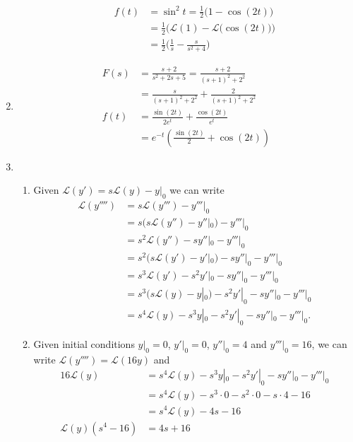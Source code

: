 \documentclass[10pt]{article}
\newcommand*{\La}{\mathcal{L}}
\begin{document}
\begin{enumerate}
\begin{enumerate}
\begin{align*}
            f(t) &= \sin^2t = \frac{1}{2}\big(1 - \cos(2t)\big) \\
            &= \frac{1}{2}\Big(\La(1) - \La\big(\cos(2t)\big)\Big) \\
            &= \frac{1}{2}\Big(\frac{1}{s} - \frac{s}{s^2 + 4}\Big)
          \end{align*}
      \end{enumerate}
    \item
      \begin{align*}
        F(s) &= \frac{s + 2}{s^2 + 2s + 5} = \frac{s + 2}{(s + 1)^2 + 2^2} \\
        &= \frac{s}{(s + 1)^2 + 2^2} + \frac{2}{(s + 1)^2 + 2^2} \\
        f(t) &= \frac{\sin(2t)}{2e^{t}} + \frac{\cos(2t)}{e^t} \\
             &= e^{-t}\left(\frac{\sin(2t)}{2} + \cos(2t)\right)
      \end{align*}
    \item
      \begin{enumerate}
        \item Given $\La(y') = s\La(y) - y|_0$ we can write
        \begin{align*}
          \La(y'''') &= s\La(y''') - y'''|_0 \\
                     &= s(s\La(y'') - y''|_0) - y'''|_0 \\
                     &= s^2\La(y'') - sy''|_0 - y'''|_0 \\
                     &= s^2(s\La(y') - y'|_0) - sy''|_0 - y'''|_0 \\
                     &= s^3\La(y') - s^2y'|_0 - sy''|_0 - y'''|_0 \\
                     &= s^3(s\La(y) - y|_0) - s^2y'|_0 - sy''|_0 - y'''|_0 \\
                     &= s^4\La(y) - s^3y|_0 - s^2y'|_0 - sy''|_0 - y'''|_0.
        \end{align*}
        \item Given initial conditions $y|_0 = 0$, $y'|_0 = 0$, $y''|_0 = 4$
          and $y'''|_0 = 16$, we can write $\La(y'''') = \La(16y)$ and
          \begin{align*}
            16\La(y) &= s^4\La(y) - s^3y|_0 - s^2y'|_0 - sy''|_0 - y'''|_0 \\
                &= s^4\La(y) - s^3 \cdot 0 - s^2 \cdot 0 - s \cdot 4 - 16 \\
                &= s^4\La(y) - 4s - 16 \\
                \La(y)(s^4 -16) &= 4s + 16 \\

\end{align*}
\end{enumerate}
\end{enumerate}
\end{document}
